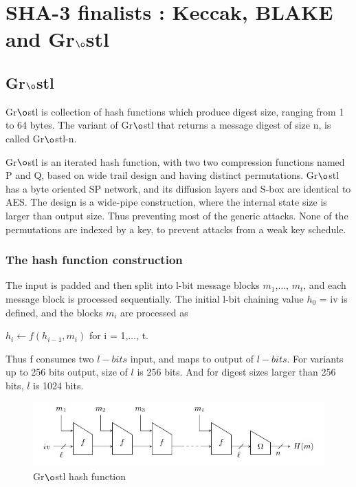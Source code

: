 \chapter{SHA-3 finalists : Keccak, BLAKE and Gr$\o$stl}

\section{Gr$\o$stl}

Gr$\o$stl is collection of hash functions which produce digest size, ranging from 1 to 64 bytes. The variant of
Gr$\o$stl that returns a message digest of size n, is called Gr$\o$stl-n.

Gr$\o$stl is an iterated hash function, with two two compression functions named P and Q, based on wide trail design
and having distinct permutations. Gr$\o$stl has a byte oriented SP network, and its diffusion layers and S-box 
are identical to AES. The design is a wide-pipe construction, where the internal state size is larger than output 
size. Thus preventing most of the generic attacks. None of the permutations are indexed by a key, to prevent attacks
from a weak key schedule. \cite{00019}

  \subsection{The hash function construction}

  The input is padded and then split into l-bit message blocks $m_{1}$,$\ldots$, $m_{t}$, and each message block is
  processed sequentially. The initial l-bit chaining value $h_{0}$ = iv is defined, and the blocks $m_{i}$ are
  processed as 

  $ h_{i}\gets f(h_{i-1}, m_{i})$ for i = 1,$\ldots$, t. 

  Thus f consumes two $l-bits$ input, and maps to output of $l-bits$. For variants up to 256 bits output, size of $l$ is
  256 bits. And for digest sizes larger than 256 bits, $l$ is 1024 bits.

  \begin{figure}
    \begin{center}
      \includegraphics[width=5.5in]{groestlhashfunction.jpg}
    \end{center}
    \caption{Gr$\o$stl hash function}
    \label{fig:lab}
  \end{figure}

